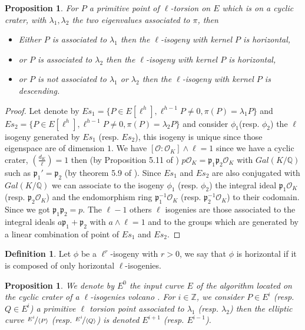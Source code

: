 \documentclass{article}
\theoremstyle{plain}
\newtheorem{prop}[thm]{Proposition}
\theoremstyle{definition}
\newtheorem{defi}[thm]{Definition}
\theoremstyle{remark}
\begin{document}
\begin{prop} \label{conjecture}
For $P$ a primitive point of $\ell$-torsion on $E$ which is on a cyclic crater, with $\lambda_1, \lambda_2$ the two eigenvalues associated to $\pi$, then
\begin{itemize}
\item Either $P$ is associated to $\lambda_1$ then the $\ell$-isogeny with kernel $P$ is horizontal,
\item or $P$ is associated to $\lambda_2$ then the $\ell$-isogeny with kernel $P$ is horizontal,
\item or $P$ is not associated to $\lambda_1$ or $\lambda_2$ then the $\ell$-isogeny with kernel $P$ is descending.
\end{itemize} 
\end{prop}

\begin{proof}
Let denote by $Es_1=\{P \in E[\ell^h], \ell^{h-1}P \neq 0, \pi(P)=\lambda_1P\}$ and $Es_2=\{P \in E[\ell^h], \ell^{h-1}P \neq 0, \pi(P)=\lambda_2P\}$ and consider $\phi_1$(resp. $\phi_2$) the $\ell$isogeny generated by $Es_1$ (resp. $Es_2$), this isogeny is unique since those eigenspace are of dimension $1$. We have $[\mathcal{O}:\mathcal{O}_K]\wedge \ell =1$ since we have a cyclic crater, $\left( \frac{d_K}{\ell} \right)=1$ then (by Proposition 5.11 of \cite{Cox89} )  $p\mathcal{O}_K=\mathfrak{p}_1\mathfrak{p}_2\mathcal{O}_K$ with $Gal(K/\mathbb{Q})$ such as $\mathfrak{p}_1'=\mathfrak{p}_2$ (by theorem 5.9 of \cite{Cox89}). Since $Es_1$ and $Es_2$ are also conjugated with $Gal(K/\mathbb{Q})$ we can associate to the isogeny $\phi_1$ (resp. $\phi_2$)  the integral ideal $\mathfrak{p}_1\mathcal{O}_K$ (resp. $\mathfrak{p}_2\mathcal{O}_K$) and the endomorphism ring $\mathfrak{p}_1^{-1}\mathcal{O}_K$ (resp. $\mathfrak{p}_2^{-1}\mathcal{O}_K$) to their codomain. Since we got $\mathfrak{p}_1\mathfrak{p}_2=p$. The $\ell - 1$ others $\ell$ isogenies are those associated to the integral ideals $a  \mathfrak{p}_1 + \mathfrak{p}_2$ with $a \wedge \ell =1$ and to the groups which are generated by a linear combination of point of $Es_1$ and $Es_2$.
\end{proof}

\begin{defi}
Let $\phi$ be a $\ell^r$-isogeny with $r>0$, we say that $\phi$ is horizontal if it is composed of only horizontal $\ell$-isogenies.
\end{defi}

\begin{prop}
We denote by $E^0$ the input curve $E$ of the algorithm located on the cyclic crater of a $\ell$-isogenies volcano . For $i \in \mathbb{Z}$, we consider $P \in E^i$ (resp. $Q \in E^i$) a primitive $\ell$ torsion point associated to $\lambda_1$ (resp. $\lambda_2$) then the elliptic curve $\nicefrac{E^i}{\langle P \rangle }$ (resp. $\nicefrac{E^i}{\langle Q \rangle }$) is denoted $E^{i+1}$ (resp. $E^{i-1}$).
\end{prop}
\end{document}
